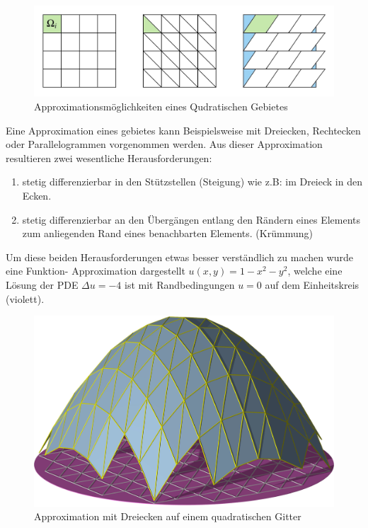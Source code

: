 \begin{figure}[h!]
	\centering
	\includegraphics[scale=0.6]{papers/fem/Images/Figuren.jpeg}
	\caption{Approximationsmöglichkeiten eines Qudratischen Gebietes}
	\label{fig:Figuren}
\end{figure}
Eine Approximation eines gebietes kann Beispielsweise mit Dreiecken, Rechtecken oder Parallelogrammen vorgenommen werden. Aus dieser Approximation resultieren zwei wesentliche Herausforderungen:
\begin{enumerate}
	\item stetig differenzierbar in den Stützstellen (Steigung) wie z.B: im Dreieck in den Ecken.
	\item stetig differenzierbar an den Übergängen entlang den Rändern eines Elements zum anliegenden Rand eines benachbarten Elements. (Krümmung)
\end{enumerate}
Um diese beiden Herausforderungen etwas besser verständlich zu machen wurde  eine Funktion- Approximation dargestellt  $u(x,y) = 1-x^2-y^2$, welche eine Lösung der PDE $\Delta u = -4$ ist mit Randbedingungen $u=0$ auf dem Einheitskreis (violett).
\begin{figure}[h]
	\centering
	\includegraphics[scale=0.8]{papers/fem/Images/ansatz.jpg}
	\caption{Approximation mit Dreiecken auf einem quadratischen Gitter }
	\label{fig:Ansatz}
\end{figure}
